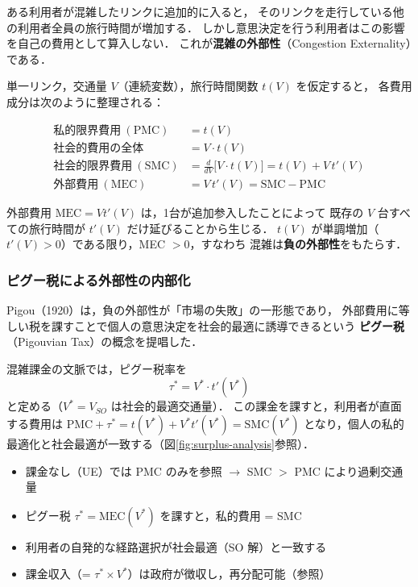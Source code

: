 ある利用者が混雑したリンクに追加的に入ると，
そのリンクを走行している他の利用者全員の旅行時間が増加する．
しかし意思決定を行う利用者はこの影響を自己の費用として算入しない．
これが\textbf{混雑の外部性}（Congestion Externality）である\cite{Pigou1920}．

単一リンク，交通量 $V$（連続変数），旅行時間関数 $t(V)$ を仮定すると，
各費用成分は次のように整理される：

\begin{align}
  \text{私的限界費用}\ (\text{PMC}) &= t(V)
    \label{eq:pmc-def}\\
  \text{社会的費用の全体}            &= V \cdot t(V)
    \label{eq:social-cost}\\
  \text{社会的限界費用}\ (\text{SMC}) &= \frac{d}{dV}\bigl[V \cdot t(V)\bigr]
    = t(V) + V\, t'(V)
    \label{eq:smc-def}\\
  \text{外部費用}\ (\text{MEC}) &= V\, t'(V)
    = \text{SMC} - \text{PMC}
    \label{eq:mec-def}
\end{align}

外部費用 $\text{MEC} = V t'(V)$ は，1台が追加参入したことによって
既存の $V$ 台すべての旅行時間が $t'(V)$ だけ延びることから生じる．
$t(V)$ が単調増加（$t'(V) > 0$）である限り，MEC $> 0$，すなわち
混雑は\textbf{負の外部性}をもたらす．

\subsubsection*{ピグー税による外部性の内部化}

Pigou（1920）は，負の外部性が「市場の失敗」の一形態であり，
外部費用に等しい税を課すことで個人の意思決定を社会的最適に誘導できるという
\textbf{ピグー税}（Pigouvian Tax）の概念を提唱した\cite{Pigou1920}．

混雑課金の文脈では，ピグー税率を
\begin{equation}
  \tau^* = V^* \cdot t'(V^*)
  \label{eq:pigou-tax}
\end{equation}
と定める（$V^* = V_{SO}$ は社会的最適交通量）．
この課金を課すと，利用者が直面する費用は
$\text{PMC} + \tau^* = t(V^*) + V^* t'(V^*) = \text{SMC}(V^*)$
となり，個人の私的最適化と社会最適が一致する（図\ref{fig:surplus-analysis}参照）．

\begin{tcolorbox}[
  colback=orange!6!white, colframe=orange!60!black,
  title={\small ピグー税の要点},
  breakable, fonttitle=\bfseries\small
]
  \begin{itemize}\setlength{\itemsep}{2pt}
    \item 課金なし（UE）では PMC のみを参照 $\rightarrow$ SMC $>$ PMC により過剰交通量
    \item ピグー税 $\tau^* = \text{MEC}(V^*)$ を課すと，私的費用 = SMC
    \item 利用者の自発的な経路選択が社会最適（SO 解）と一致する
    \item 課金収入（= $\tau^* \times V^*$）は政府が徴収し，再分配可能（参照）
  \end{itemize}
\end{tcolorbox}

